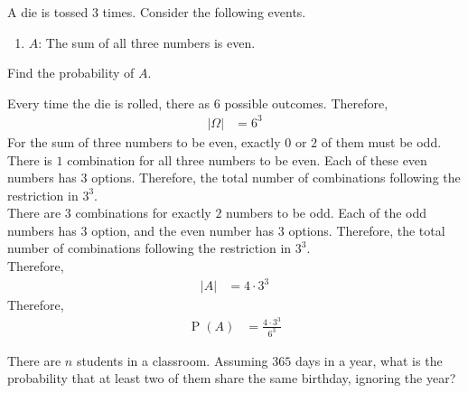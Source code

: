 \documentclass[titlepage, fleqn, a4paper, 12pt, twoside]{article}
\theoremstyle{definition}
\theoremstyle{theorem}
\DeclareMathOperator{\prob}{\mathrm{P}}
\begin{document}
\begin{question}
	A die is tossed $3$ times.
	Consider the following events.
	\begin{enumerate}
		\item $A$: The sum of all three numbers is even.
	\end{enumerate}
	Find the probability of $A$.
\end{question}

\begin{solution}
	Every time the die is rolled, there as $6$ possible outcomes.
	Therefore,
	\begin{align*}
		|\Omega| & = 6^3
	\end{align*}
	For the sum of three numbers to be even, exactly $0$ or $2$ of them must be odd.\\
	There is $1$ combination for all three numbers to be even.
	Each of these even numbers has $3$ options.
	Therefore, the total number of combinations following the restriction in $3^3$.\\
	There are $3$ combinations for exactly $2$ numbers to be odd.
	Each of the odd numbers has $3$ option, and the even number has $3$ options.
	Therefore, the total number of combinations following the restriction in $3^3$.\\
	Therefore,
	\begin{align*}
		|A| & = 4 \cdot 3^3
	\end{align*}
	Therefore,
	\begin{align*}
		\prob(A) & = \frac{4 \cdot 3^3}{6^3}
	\end{align*}
\end{solution}

\begin{question}
	There are $n$ students in a classroom.
	Assuming $365$ days in a year, what is the probability that at least two of them share the same birthday, ignoring the year?
\end{question}
\end{document}
